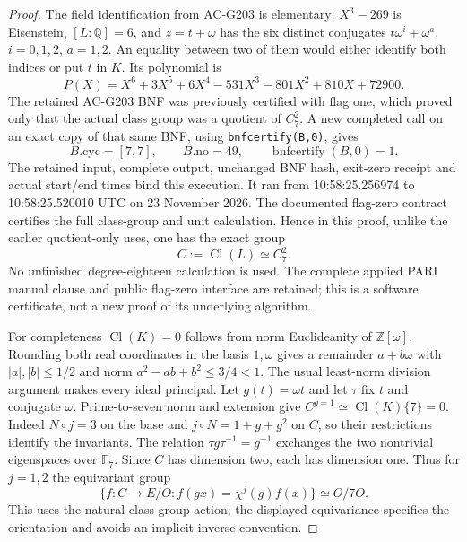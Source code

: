 \begin{proof}
The field identification from AC-G203 is elementary:
$X^3-269$ is Eisenstein, $[L:\mathbb Q]=6$, and $z=t+\omega$
has the six distinct conjugates $t\omega^i+\omega^a$,
$i=0,1,2$, $a=1,2$.  An equality between two of them would
either identify both indices or put $t$ in $K$.  Its polynomial is
\[
 P(X)=X^6+3X^5+6X^4-531X^3-801X^2+810X+72900.
 \tag{MRT.9}
\]
The retained AC-G203 BNF was previously certified with flag one,
which proved only that the actual class group was a quotient of
$C_7^2$.  A new completed call on an exact copy of that same BNF,
using \texttt{bnfcertify(B,0)}, gives
\[
 B.\mathrm{cyc}=[7,7],\qquad B.\mathrm{no}=49,
                 \qquad \operatorname{bnfcertify}(B,0)=1.
 \tag{MRT.10}
\]
The retained input, complete output, unchanged BNF hash, exit-zero
receipt and actual start/end times bind this execution.  It ran
from 10:58:25.256974 to 10:58:25.520010 UTC on 23 November 2026.
The documented flag-zero contract certifies the full class-group
and unit calculation.  Hence in this proof, unlike the earlier
quotient-only uses, one has the exact group
\[
                         C:=\operatorname{Cl}(L)\simeq C_7^2.
 \tag{MRT.11}
\]
No unfinished degree-eighteen calculation is used.  The complete
applied PARI manual clause and public flag-zero interface are
retained; this is a software certificate, not a new proof of its
underlying algorithm.

For completeness $\operatorname{Cl}(K)=0$ follows from norm
Euclideanity of $\mathbb Z[\omega]$.  Rounding both real coordinates
in the basis $1,\omega$ gives a remainder $a+b\omega$ with
$|a|,|b|\leq1/2$ and norm $a^2-ab+b^2\leq3/4<1$.
The usual least-norm division argument makes every ideal principal.
Let $g(t)=\omega t$ and let $\tau$ fix $t$ and conjugate $\omega$.
Prime-to-seven norm and extension give
$C^{g=1}\simeq\operatorname{Cl}(K)\{7\}=0$.
Indeed $N\circ j=3$ on the base and $j\circ N=1+g+g^2$
on $C$, so their restrictions identify the invariants.
The relation $\tau g\tau^{-1}=g^{-1}$ exchanges the two
nontrivial eigenspaces over $\mathbb F_7$.  Since $C$ has dimension
two, each has dimension one.  Thus for $j=1,2$ the equivariant group
\[
 \{f:C\longrightarrow E/O: f(gx)=\chi^j(g)f(x)\}
                         \simeq O/7O.                         \tag{MRT.12}
\]
This uses the natural class-group action; the displayed equivariance
specifies the orientation and avoids an implicit inverse convention.


\end{proof}
